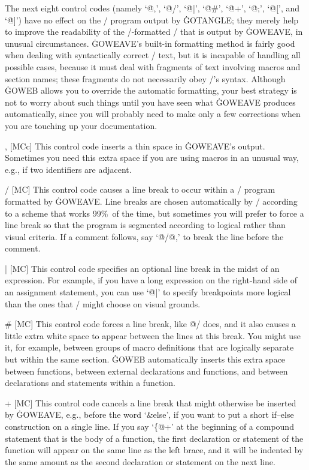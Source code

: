 \subsec
The next eight control codes (namely `\.{@,}', `\.{@/}', `\.{@|}', `\.{@\#}',
`\.{@+}', `\.{@;}', `\.{@[}', and `\.{@]}') have no effect on the \GO/
program output by \.{GOTANGLE}; they merely help to improve the readability
of the \TEX/-formatted \GO/ that is output by \.{GOWEAVE}, in unusual
circumstances. \.{GOWEAVE}'s built-in formatting method is fairly good
when dealing with syntactically correct \GO/ text, but
it is incapable of handling all possible cases, because it must deal with
fragments of text involving macros and section names; these fragments do
not necessarily obey \GO/'s syntax. Although \.{GOWEB} allows you to
override the automatic formatting, your best strategy is not to worry
about such things until you have seen what \.{GOWEAVE} produces automatically,
since you will probably need to make only a few corrections when you are
touching up your documentation.

\@, [MCc] This control code inserts a thin space in \.{GOWEAVE}'s output.
Sometimes you need this extra space if you are using
macros in an unusual way, e.g., if two identifiers are adjacent.

\@/ [MC] This control code causes a line break to occur within a \GO/
program formatted by \.{GOWEAVE}. Line breaks
are chosen automatically by \TEX/ according to a scheme that works 99\%\
of the time, but sometimes you will prefer to force a line break so that
the program is segmented according to logical rather than visual
criteria. If a comment follows, say `\.{@/@,}' to break the line
before the comment.

\@| [MC] This control code specifies an optional line break in the midst of
an expression. For example, if you have
a long expression on the right-hand side of an assignment
statement, you can use `\.{@|}' to specify breakpoints more logical than
the ones that \TEX/ might choose on visual grounds.

\@\# [MC] This control code forces a line break, like \.{@/} does,
and it also causes a little extra white space to appear between the lines at
this break. You might use it, for example,
between groups of macro definitions that are logically separate but within
the same section. \.{GOWEB} automatically inserts this extra space
between functions, between external declarations and functions, and
between declarations and statements within a function.

\@+ [MC] This control code cancels a line break that might otherwise be
inserted by \.{GOWEAVE}, e.g., before the word `\&{else}', if you want to
put a short if--else construction on a single line.
If you say `\.{\{@+}' at the beginning of a compound statement
that is the body of a function, the first declaration or
statement of the function will appear on the same line as the
left brace, and it will be indented by the same amount as the
second declaration or statement on the next line.

